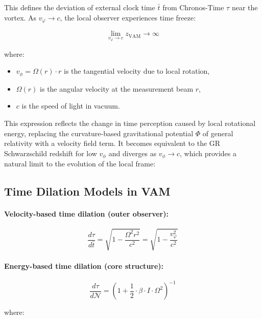 \documentclass[preprint]{revtex4-2}
\begin{document}
This defines the deviation of external clock time \( \bar{t} \) from Chronos-Time \( \tau \) near the vortex. As \( v_\varphi \to c \), the local observer experiences time freeze:

\[
    \lim_{v_\varphi \to c} z_\text{VAM} \to \infty
\]

where:
\begin{itemize}
    \item \( v_\phi = \Omega(r) \cdot r \) is the tangential velocity due to local rotation,
    \item \( \Omega(r) \) is the angular velocity at the measurement beam \( r \),
    \item \( c \) is the speed of light in vacuum.

\end{itemize}

This expression reflects the change in time perception caused by local rotational energy, replacing the curvature-based gravitational potential \( \Phi \) of general relativity with a velocity field term. It becomes equivalent to the GR Schwarzschild redshift for low \( v_\phi \) and diverges as \( v_\phi \rightarrow c \), which provides a natural limit to the evolution of the local frame:

\subsection*{Time Dilation Models in VAM}

\paragraph{Velocity-based time dilation (outer observer):}

\begin{equation}
    \frac{d\tau}{d\bar{t}} =
    \sqrt{1 - \frac{\Omega^2 r^2}{c^2}} = \sqrt{1 - \frac{v_\varphi^2}{c^2}}
\end{equation}

\paragraph{Energy-based time dilation (core structure):}

\begin{equation}
    \frac{d\tau}{d\mathcal{N}} =
    \left( 1 + \frac{1}{2} \cdot \beta \cdot I \cdot \Omega^2 \right)^{-1}
\end{equation}

\noindent where:
\end{document}
